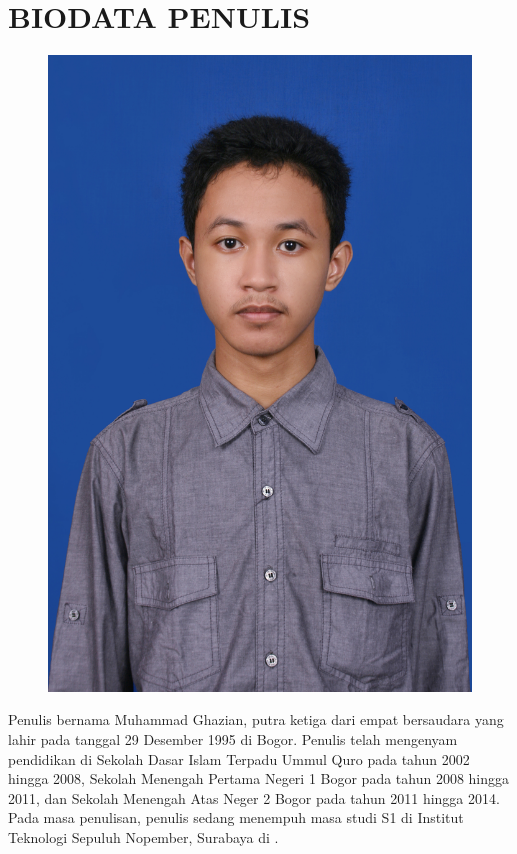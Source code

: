 \chapter{BIODATA PENULIS}

\begin{figure}
	\includegraphics[height=0.3\textheight]{penutup/img/IMG_3563}
\end{figure}

Penulis bernama Muhammad Ghazian, putra ketiga dari empat bersaudara yang lahir pada tanggal 29 Desember 1995 di Bogor. Penulis telah mengenyam pendidikan di Sekolah Dasar Islam Terpadu Ummul Quro pada tahun 2002 hingga 2008, Sekolah Menengah Pertama Negeri 1 Bogor pada tahun 2008 hingga 2011, dan Sekolah Menengah Atas Neger 2 Bogor pada tahun 2011 hingga 2014. Pada masa penulisan, penulis sedang menempuh masa studi S1 di Institut Teknologi Sepuluh Nopember, Surabaya di \jurusanbaru.

